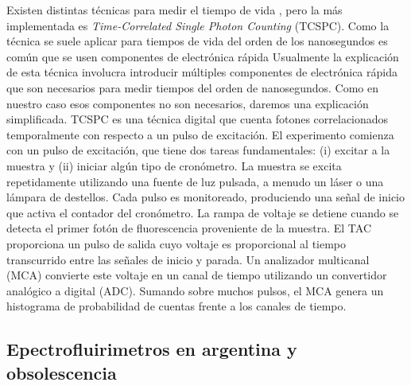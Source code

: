 Existen distintas técnicas para medir el tiempo de vida \cite{becker_fluorescence_2012}, pero la más implementada es \textit{Time-Correlated Single Photon Counting} (TCSPC).
Como la técnica se suele aplicar para tiempos de vida del orden de los nanosegundos es común que se usen componentes de electrónica rápida 
Usualmente la explicación de esta técnica involucra introducir múltiples componentes de electrónica rápida que son necesarios para medir tiempos del orden de nanosegundos.
Como en nuestro caso esos componentes no son necesarios, daremos una explicación simplificada.
TCSPC es una técnica digital que cuenta fotones correlacionados temporalmente con respecto a un pulso de excitación.
El experimento comienza con un pulso de excitación, que tiene dos tareas fundamentales: (i) excitar a la muestra y (ii) iniciar algún tipo de cronómetro.
La muestra se excita repetidamente utilizando una fuente de luz pulsada, a menudo un láser o una lámpara de destellos.
Cada pulso es monitoreado, produciendo una señal de inicio que activa el contador del cronómetro.
La rampa de voltaje se detiene cuando se detecta el primer fotón de fluorescencia proveniente de la muestra.
El TAC proporciona un pulso de salida cuyo voltaje es proporcional al tiempo transcurrido entre las señales de inicio y parada.
Un analizador multicanal (MCA) convierte este voltaje en un canal de tiempo utilizando un convertidor analógico a digital (ADC).
Sumando sobre muchos pulsos, el MCA genera un histograma de probabilidad de cuentas frente a los canales de tiempo.


\subsection{Epectrofluirimetros en argentina y obsolescencia}


